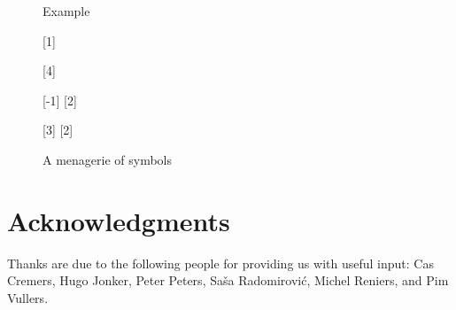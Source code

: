 \documentclass[12pt,a4paper]{article}
\begin{document}
\begin{figure}[htb]
\begin{center}
\begin{msc}{Example}

[1]
\nextlevel

[4]

\nextlevel
{}
\nextlevel

[-1]
[2]
\nextlevel


\nextlevel

[3]
[2]
\nextlevel

\nextlevel

\nextlevel

\nextlevel

\nextlevel

\nextlevel[2]

\end{msc}

\caption{A menagerie of \MSC{} symbols}
\label{ex}
\end{center}
\end{figure}


\section{Acknowledgments}
Thanks are due to the following people for providing us with useful
input: Cas Cremers, Hugo Jonker, Peter Peters, Sa\v{s}a Radomirovi\'c,
Michel Reniers, and Pim Vullers.



\printindex
\end{document}
